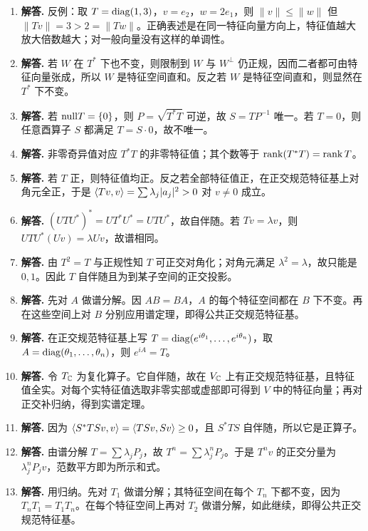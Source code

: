 \begin{enumerate}[label=\textbf{\arabic*.}, leftmargin=*, itemsep=1em]
\item \textbf{解答.} 反例：取 $T=\mathrm{diag}(1,3)$，$v=e_2$，$w=2e_1$，则 $\|v\|\le\|w\|$ 但 $\|Tv\|=3>2=\|Tw\|$。正确表述是在同一特征向量方向上，特征值越大放大倍数越大；对一般向量没有这样的单调性。
\item \textbf{解答.} 若 $W$ 在 $T^*$ 下也不变，则限制到 $W$ 与 $W^\perp$ 仍正规，因而二者都可由特征向量张成，所以 $W$ 是特征空间直和。反之若 $W$ 是特征空间直和，则显然在 $T^*$ 下不变。
\item \textbf{解答.} 若 $\mathrm{null} T=\{0\}$，则 $P=\sqrt{T^*T}$ 可逆，故 $S=TP^{-1}$ 唯一。若 $T=0$，则任意酉算子 $S$ 都满足 $T=S\cdot0$，故不唯一。
\item \textbf{解答.} 非零奇异值对应 $T^*T$ 的非零特征值；其个数等于 $\operatorname{rank}(T^*T)=\operatorname{rank} T$。
\item \textbf{解答.} 若 $T$ 正，则特征值均正。反之若全部特征值正，在正交规范特征基上对角元全正，于是 $\langle Tv, v \rangle=\sum \lambda_j|a_j|^2>0$ 对 $v\neq0$ 成立。
\item \textbf{解答.} $(UTU^*)^*=UT^*U^*=UTU^*$，故自伴随。若 $Tv=\lambda v$，则 $UTU^*(Uv)=\lambda Uv$，故谱相同。
\item \textbf{解答.} 由 $T^2=T$ 与正规性知 $T$ 可正交对角化；对角元满足 $\lambda^2=\lambda$，故只能是 $0,1$。因此 $T$ 自伴随且为到某子空间的正交投影。
\item \textbf{解答.} 先对 $A$ 做谱分解。因 $AB=BA$，$A$ 的每个特征空间都在 $B$ 下不变。再在这些空间上对 $B$ 分别应用谱定理，即得公共正交规范特征基。
\item \textbf{解答.} 在正交规范特征基上写 $T=\mathrm{diag}(e^{i\theta_1},\dots,e^{i\theta_n})$，取 $A=\mathrm{diag}(\theta_1,\dots,\theta_n)$，则 $e^{iA}=T$。
\item \textbf{解答.} 令 $T_{\mathbb{C}}$ 为复化算子。它自伴随，故在 $V_{\mathbb{C}}$ 上有正交规范特征基，且特征值全实。对每个实特征值选取非零实部或虚部即可得到 $V$ 中的特征向量；再对正交补归纳，得到实谱定理。
\item \textbf{解答.} 因为 $\langle S^*TSv, v \rangle=\langle TSv, Sv \rangle\ge0$，且 $S^*TS$ 自伴随，所以它是正算子。
\item \textbf{解答.} 由谱分解 $T=\sum \lambda_jP_j$，故 $T^n=\sum \lambda_j^nP_j$。于是 $T^nv$ 的正交分量为 $\lambda_j^nP_jv$，范数平方即为所示和式。
\item \textbf{解答.} 用归纳。先对 $T_1$ 做谱分解；其特征空间在每个 $T_n$ 下都不变，因为 $T_nT_1=T_1T_n$。在每个特征空间上再对 $T_2$ 做谱分解，如此继续，即得公共正交规范特征基。
\end{enumerate}
